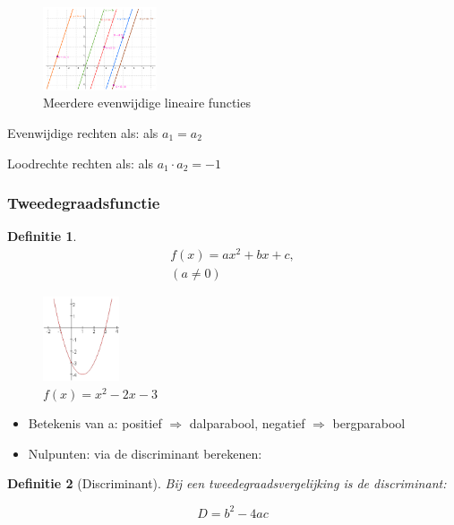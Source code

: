 \documentclass{article}
\newtheorem{theorem}{Definitie}[section]
\begin{document}
\begin{figure}[H]
    \centering
    \includegraphics[width=0.3\textwidth]{functie-lineair2.png}
    \caption{Meerdere evenwijdige lineaire functies}
\end{figure}

Evenwijdige rechten als: als $a_1 = a_2$

Loodrechte rechten als: als $a_1 \cdot a_2 = -1$

\subsubsection{Tweedegraadsfunctie}

\begin{theorem}
\begin{equation}
    \begin{aligned}
        f(x) = ax^2 + bx + c,\\
        (a \neq 0)
    \end{aligned}
\end{equation}


\end{theorem}

\begin{figure}[H]
    \centering
    \includegraphics[width=0.2\textwidth]{functie-2degraad.png}
    \caption{$f(x) = x^2 - 2x - 3$}
\end{figure}

\begin{itemize}
    \item Betekenis van a: positief $\Rightarrow$ dalparabool, negatief $\Rightarrow$ bergparabool
    \item Nulpunten: via de discriminant berekenen:
\end{itemize}

\begin{theorem}[Discriminant]
Bij een tweedegraadsvergelijking is de discriminant:

\begin{equation}
    D = b^2 - 4ac
\end{equation}
\end{theorem}
\end{document}
